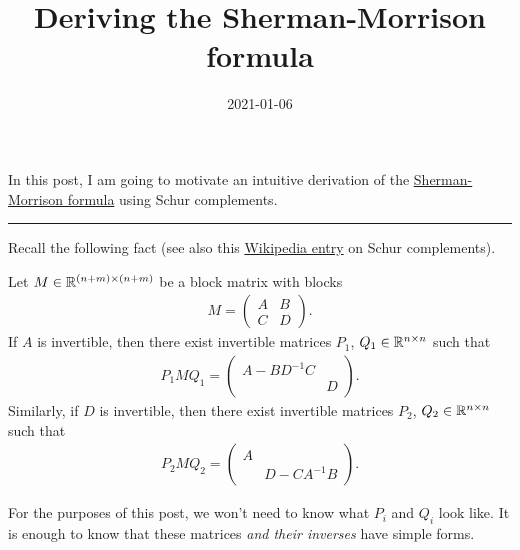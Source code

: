 \documentclass{article}
\title{Deriving the Sherman-Morrison formula}
\date{2021-01-06}
\begin{document}
In this post, I am going to motivate an intuitive derivation of the 
\href{https://en.wikipedia.org/wiki/Sherman%E2%80%93Morrison_formula}{Sherman-Morrison formula} using Schur complements.

\rule{0.5\linewidth}{\linethickness}

Recall the following fact (see also this \href{https://en.wikipedia.org/wiki/Schur_complement}{Wikipedia entry} on Schur complements).
\begin{lemma}
\label{lem:schur}
Let $M\in{\mathbb{R}}^{(n+m)\times (n+m)}$ be a block matrix with blocks
\begin{align*}
M = \begin{pmatrix}
	A & B\\
	C & D
\end{pmatrix}	.
\end{align*}
If $A$ is invertible, then there exist invertible matrices $P_1$, $Q_1\in{\mathbb{R}}^{n\times n}$ such that
\begin{align*}
P_1 M Q_1 = \begin{pmatrix}
	A - BD^{-1}C&\\& D
\end{pmatrix}.
\end{align*}
Similarly, if $D$ is invertible, then there exist invertible matrices $P_2$, $Q_2\in{\mathbb{R}}^{n\times n}$ such that
\begin{align*}
P_2 M Q_2 = \begin{pmatrix}
	A &\\&D - CA^{-1}B
\end{pmatrix}.
\end{align*}
\end{lemma}
For the purposes of this post, we won't need to know what $P_i$ and $Q_i$ look like. It is enough to know that these matrices \textit{and their inverses} have simple forms.
\end{document}
